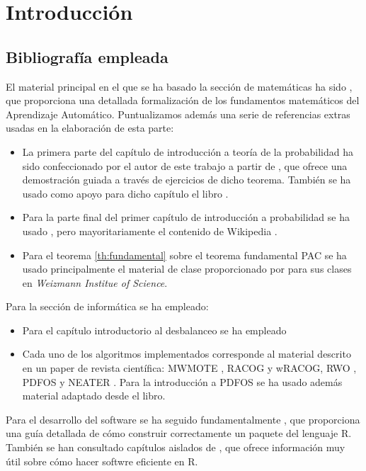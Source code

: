 \chapter*{Introducción}

  \section*{Bibliografía empleada}
  El material principal en el que se ha basado la sección de matemáticas ha sido \citep{shalev}, 
  que proporciona una detallada formalización de los fundamentos matemáticos del Aprendizaje Automático. Puntualizamos además
  una serie de referencias extras usadas en la elaboración de esta parte:
  
  \begin{itemize} 
   \item La primera parte del capítulo de introducción a teoría de la probabilidad ha sido confeccionado por el autor de 
   este trabajo a partir de \citep{caratheodory}, que ofrece una demostración guiada a través de ejercicios de dicho teorema. 
   También se ha usado como apoyo para dicho capítulo el libro \citep{loeve}. 
   \item Para la parte final del primer capítulo de introducción a probabilidad se ha usado \citep{shalev}, pero
   mayoritariamente el contenido de Wikipedia \citep{wiki:markov, wiki:hoeff_lemma, wiki:hoeffding}.
   \item Para el teorema \ref{th:fundamental} sobre el teorema fundamental PAC se ha usado principalmente el material de clase
   proporcionado por \citep{slfetaya} para sus clases en \textit{Weizmann Institue of Science}.
  \end{itemize}
   
   Para la sección de informática se ha empleado:
   
  \begin{itemize}
   \item Para el capítulo introductorio al desbalanceo se ha empleado \citep{he2009} 
   \item Cada uno de los algoritmos implementados corresponde al material descrito en un paper de revista científica: 
   MWMOTE \citep{chawla02}, RACOG y wRACOG\citep{das2015}, RWO \citep{zhang2014}, PDFOS \citep{gao2014} y 
   NEATER \citep{almogahed2014}. Para la introducción a PDFOS se ha usado además material adaptado desde el libro\citeauthor{silverman}.
  \end{itemize}

   Para el desarrollo del software se ha seguido fundamentalmente \citep*{rhadleypkg}, que proporciona una guía detallada de
   cómo construir correctamente un paquete del lenguaje R. También se han consultado capítulos aislados de \citep*{rgillespie},
   que ofrece información muy útil sobre cómo hacer softwre eficiente en R.